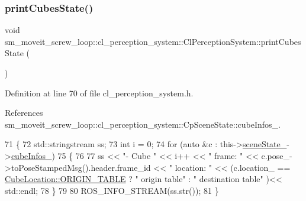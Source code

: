 \subsubsection{\texorpdfstring{print\+Cubes\+State()}{printCubesState()}}
{\footnotesize\ttfamily void sm\+\_\+moveit\+\_\+screw\+\_\+loop\+::cl\+\_\+perception\+\_\+system\+::\+Cl\+Perception\+System\+::print\+Cubes\+State (\begin{DoxyParamCaption}{ }\end{DoxyParamCaption})\hspace{0.3cm}{\ttfamily [inline]}}



Definition at line 70 of file cl\+\_\+perception\+\_\+system.\+h.



References sm\+\_\+moveit\+\_\+screw\+\_\+loop\+::cl\+\_\+perception\+\_\+system\+::\+Cp\+Scene\+State\+::cube\+Infos\+\_\+.


\begin{DoxyCode}
71             \{
72                 std::stringstream ss;
73                 \textcolor{keywordtype}{int} i = 0;
74                 \textcolor{keywordflow}{for} (\textcolor{keyword}{auto} &c : this->\hyperlink{classsm__moveit__screw__loop_1_1cl__perception__system_1_1ClPerceptionSystem_abb08b3cc6d4ec414a608da92133b1f66}{sceneState\_}->\hyperlink{classsm__moveit__screw__loop_1_1cl__perception__system_1_1CpSceneState_afef6eaf7eb94cf74b9333a373b2fb35d}{cubeInfos\_})
75                 \{
76 
77                     ss << \textcolor{stringliteral}{"- Cube "} << i++ << \textcolor{stringliteral}{" frame: "} << c.pose\_->toPoseStampedMsg().header.frame\_id << \textcolor{stringliteral}{
      " location: "} << (c.location\_ == \hyperlink{namespacesm__moveit__screw__loop_1_1cl__perception__system_a3685ee11048648ccb59214d2341fb8caae5ee34c3ef8ec4a46a00a218416c7b1d}{CubeLocation::ORIGIN\_TABLE} ? \textcolor{stringliteral}{" origin table"} : \textcolor{stringliteral}{"
       destination table"} )<< std::endl;
78                 \}
79 
80                 ROS\_INFO\_STREAM(ss.str());
81             \}
\end{DoxyCode}
\mbox{\label{classsm__moveit__screw__loop_1_1cl__perception__system_1_1ClPerceptionSystem_a171e1bf0334b2eb957792ecb3ad11b7a}} 
